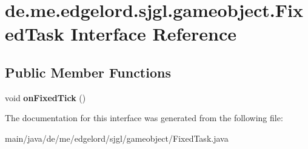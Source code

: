 \hypertarget{interfacede_1_1me_1_1edgelord_1_1sjgl_1_1gameobject_1_1_fixed_task}{}\section{de.\+me.\+edgelord.\+sjgl.\+gameobject.\+Fixed\+Task Interface Reference}
\label{interfacede_1_1me_1_1edgelord_1_1sjgl_1_1gameobject_1_1_fixed_task}
\subsection*{Public Member Functions}
\begin{DoxyCompactItemize}
\item 
\mbox{\label{interfacede_1_1me_1_1edgelord_1_1sjgl_1_1gameobject_1_1_fixed_task_ac20cc77135baf926df5d21f7e83305ac}} 
void {\bfseries on\+Fixed\+Tick} ()
\end{DoxyCompactItemize}


The documentation for this interface was generated from the following file\+:\begin{DoxyCompactItemize}
\item 
main/java/de/me/edgelord/sjgl/gameobject/Fixed\+Task.\+java\end{DoxyCompactItemize}
